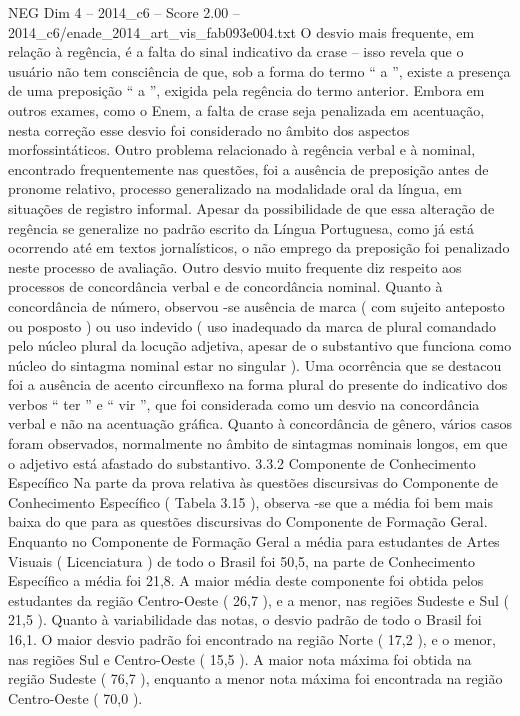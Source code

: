 \begin{textsample}{NEG Dim 4 – 2014\_c6 – Score 2.00 – 2014\_c6/enade\_2014\_art\_vis\_fab093e004.txt}
O desvio mais frequente, em relação à regência, é a falta do sinal indicativo da crase – isso revela que o usuário não tem consciência de que, sob a forma do termo “ a ”, existe a presença de uma preposição “ a ”, exigida pela regência do termo anterior.
Embora em outros exames, como o Enem, a falta de crase seja penalizada em acentuação, nesta correção esse desvio foi considerado no âmbito dos aspectos morfossintáticos.
Outro problema relacionado à regência verbal e à nominal, encontrado frequentemente nas questões, foi a ausência de preposição antes de pronome relativo, processo generalizado na modalidade oral da língua, em situações de registro informal.
Apesar da possibilidade de que essa alteração de regência se generalize no padrão escrito da Língua Portuguesa, como já está ocorrendo até em textos jornalísticos, o não emprego da preposição foi penalizado neste processo de avaliação.
Outro desvio muito frequente diz respeito aos processos de concordância verbal e de concordância nominal.
Quanto à concordância de número, observou -se ausência de marca ( com sujeito anteposto ou posposto ) ou uso indevido ( uso inadequado da marca de plural comandado pelo núcleo plural da locução adjetiva, apesar de o substantivo que funciona como núcleo do sintagma nominal estar no singular ).
Uma ocorrência que se destacou foi a ausência de acento circunflexo na forma plural do presente do indicativo dos verbos “ ter ” e “ vir ”, que foi considerada como um desvio na concordância verbal e não na acentuação gráfica.
Quanto à concordância de gênero, vários casos foram observados, normalmente no âmbito de sintagmas nominais longos, em que o adjetivo está afastado do substantivo. 3.3.2 Componente de Conhecimento Específico Na parte da prova relativa às questões discursivas do Componente de Conhecimento Específico ( Tabela 3.15 ), observa -se que a média foi bem mais baixa do que para as questões discursivas do Componente de Formação Geral.
Enquanto no Componente de Formação Geral a média para estudantes de Artes Visuais ( Licenciatura ) de todo o Brasil foi 50,5, na parte de Conhecimento Específico a média foi 21,8.
A maior média deste componente foi obtida pelos estudantes da região Centro-Oeste ( 26,7 ), e a menor, nas regiões Sudeste e Sul ( 21,5 ).
Quanto à variabilidade das notas, o desvio padrão de todo o Brasil foi 16,1.
O maior desvio padrão foi encontrado na região Norte ( 17,2 ), e o menor, nas regiões Sul e Centro-Oeste ( 15,5 ).
A maior nota máxima foi obtida na região Sudeste ( 76,7 ), enquanto a menor nota máxima foi encontrada na região Centro-Oeste ( 70,0 ).

\end{textsample}
